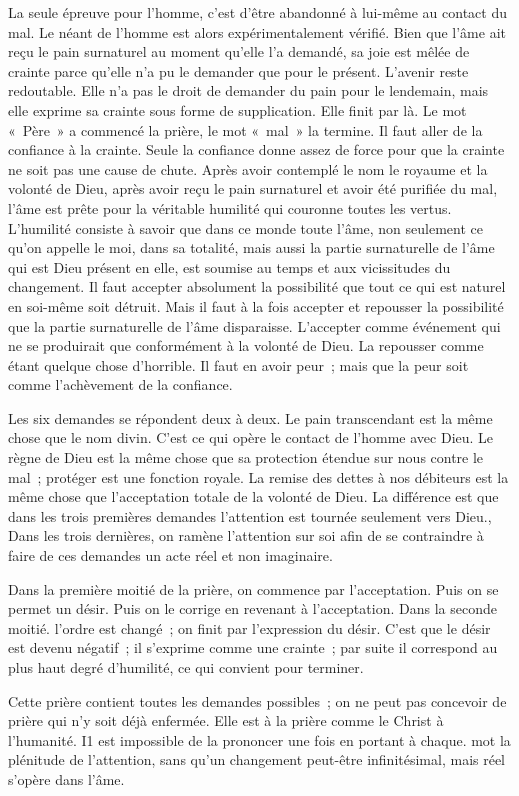 \documentclass[french,twoside]{book} %
\newenvironment{quoteblock}%
  {\begin{quoting}}
  {\end{quoting}}
\newcommand\chapterclose{} %
\newenvironment{quotebar}{%
    \def\FrameCommand{{\color{rubric!10!}\vrule width 0.5em} \hspace{0.9em}}%
    \def\OuterFrameSep{\itemsep} %
    \MakeFramed {\advance\hsize-\width \FrameRestore}
  }%
  {%
    \endMakeFramed
  }
\renewenvironment{quoteblock}%
  {%
    \savenotes
    \setstretch{0.9}
    \normalfont
    \begin{quotebar}
  }
  {%
    \end{quotebar}
    \spewnotes
  }
\begin{document}
\begin{quoteblock}
 \end{quoteblock}

\noindent La seule épreuve pour l'homme, c'est d'être abandonné à lui-même au contact du mal. Le néant de l'homme est alors expérimentalement vérifié. Bien que l'âme ait reçu le pain surnaturel au moment qu'elle l'a demandé, sa joie est mêlée de crainte parce qu'elle n'a pu le demander que pour le présent. L'avenir reste redoutable. Elle n'a pas le droit de demander du pain pour le lendemain, mais elle exprime sa crainte sous forme de supplication. Elle finit par là. Le mot « Père » a commencé la prière, le mot « mal » la termine. Il faut aller de la confiance à la crainte. Seule la confiance donne assez de force pour que la crainte ne soit pas une cause de chute. Après avoir contemplé le nom le royaume et la volonté de Dieu, après avoir reçu le pain surnaturel et avoir été purifiée du mal, l'âme est prête pour la véritable humilité qui couronne toutes les vertus. L'humilité consiste à savoir que dans ce monde toute l'âme, non seulement ce qu'on appelle le moi, dans sa totalité, mais aussi la partie surnaturelle de l'âme qui est Dieu présent en elle, est soumise au temps et aux vicissitudes du changement. Il faut accepter absolument la possibilité que tout ce qui est naturel en soi-même soit détruit. Mais il faut à la fois accepter et repousser la possibilité que la partie surnaturelle de l'âme disparaisse. L'accepter comme événement qui ne se produirait que conformément à la volonté de Dieu. La repousser comme étant quelque chose d'horrible. Il faut en avoir peur ; mais que la peur soit comme l'achèvement de la confiance.\par
Les six demandes se répondent deux à deux. Le pain transcendant est la même chose que le nom divin. C'est ce qui opère le contact de l'homme avec Dieu. Le règne de Dieu est la même chose que sa protection étendue sur nous contre le mal ; protéger est une fonction royale. La remise des dettes à nos débiteurs est la même chose que l'acceptation totale de la volonté de Dieu. La différence est que dans les trois premières demandes l'attention est tournée seulement vers Dieu., Dans les trois dernières, on ramène l'attention sur soi afin de se contraindre à faire de ces demandes un acte réel et non imaginaire.\par
Dans la première moitié de la prière, on commence par l'acceptation. Puis on se permet un désir. Puis on le corrige en revenant à l'acceptation. Dans la seconde moitié. l'ordre est changé ; on finit par l'expression du désir. C'est que le désir est devenu négatif ; il s'exprime comme une crainte ; par suite il correspond au plus haut degré d'humilité, ce qui convient pour terminer.\par
Cette prière contient toutes les demandes possibles ; on ne peut pas concevoir de prière qui n'y soit déjà enfermée. Elle est à la prière comme le Christ à l'humanité. I1 est impossible de la prononcer une fois en portant à chaque. mot la plénitude de l'attention, sans qu'un changement peut-être infinitésimal, mais réel s'opère dans l'âme.
\chapterclose
\end{document}
